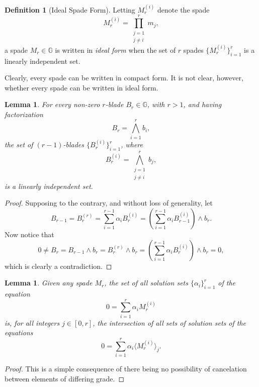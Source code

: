 \documentclass{birkjour}
\newtheorem{lem}[thm]{Lemma}
\theoremstyle{definition}
\newtheorem{defn}[thm]{Definition}
\theoremstyle{remark}
\numberwithin{equation}{section}
\newcommand{\G}{\mathbb{G}}
\begin{document}
\begin{defn}[Ideal Spade Form]
Letting $M_r^{(i)}$ denote the spade
\begin{equation*}
M_r^{(i)}=\prod_{\substack{j=1\\j\neq i}}^r m_j,
\end{equation*}
a spade $M_r\in\G$ is written in \emph{ideal form} when the set of $r$ spades $\{M_r^{(i)}\}_{i=1}^r$
is a linearly independent set.
\end{defn}

Clearly, every spade can be written in compact form.
It is not clear, however, whether every spade can be written in ideal form.

\begin{lem}\label{lem_lin_indep_blades}
For every non-zero $r$-blade $B_r\in\G$, with $r>1$, and having factorization
\begin{equation*}
B_r = \bigwedge_{i=1}^r b_i,
\end{equation*}
the set of $(r-1)$-blades $\{B_r^{(i)}\}_{i=1}^r$, where
\begin{equation*}
B_r^{(i)}=\bigwedge_{\substack{j=1\\j\neq i}}^r b_j,
\end{equation*}
is a linearly independent set.
\end{lem}
\begin{proof}
Supposing to the contrary, and without loss of generality, let
\begin{equation*}
B_{r-1} = B_r^{(r)} = \sum_{i=1}^{r-1}\alpha_i B_r^{(i)} = \left(\sum_{i=1}^{r-1}\alpha_i B_{r-1}^{(i)}\right)\wedge b_r.
\end{equation*}
Now notice that
\begin{equation*}
0\neq B_r = B_{r-1}\wedge b_r = B_r^{(r)}\wedge b_r = \left(\sum_{i=1}^{r-1}\alpha_i B_r^{(i)}\right)\wedge b_r = 0,
\end{equation*}
which is clearly a contradiction.
\end{proof}

\begin{lem}\label{lem_solution_intersection}
Given any spade $M_r$, the set of all solution sets $\{\alpha_i\}_{i=1}^r$ of the equation
\begin{equation*}
0 = \sum_{i=1}^r\alpha_i M_r^{(i)}
\end{equation*}
is, for all integers $j\in[0,r]$, the intersection of all sets of solution sets of the equations
\begin{equation*}
0 = \sum_{i=1}^r\alpha_i\langle M_r^{(i)}\rangle_j.
\end{equation*}
\end{lem}
\begin{proof}
This is a simple consequence of there being no possibility of cancelation between elements of differing grade.
\end{proof}
\end{document}
